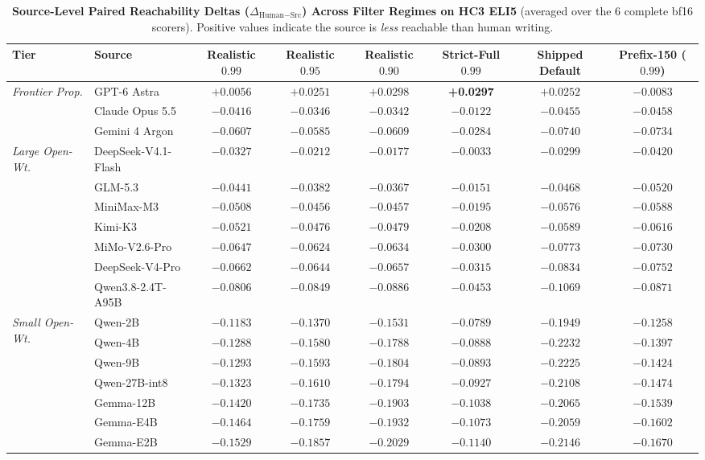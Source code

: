 \documentclass[11pt,a4paper,twocolumn]{article}
\begin{document}
\begin{table}[t]
\centering
\scriptsize
\setlength{\tabcolsep}{4.2pt}
\begin{tabular}{llcccccc}
\toprule
\textbf{Tier} & \textbf{Source} & \textbf{Realistic $0.99$} & \textbf{Realistic $0.95$} & \textbf{Realistic $0.90$} & \textbf{Strict-Full $0.99$} & \textbf{Shipped Default} & \textbf{Prefix-150 ($0.99$)} \\
\midrule
\multirow{3}{*}{\textit{Frontier Prop.}}
 & GPT-6 Astra & $+0.0056$ & $+0.0251$ & $+0.0298$ & \textbf{+0.0297} & $+0.0252$ & $-0.0083$ \\
 & Claude Opus 5.5 & $-0.0416$ & $-0.0346$ & $-0.0342$ & $-0.0122$ & $-0.0455$ & $-0.0458$ \\
 & Gemini 4 Argon & $-0.0607$ & $-0.0585$ & $-0.0609$ & $-0.0284$ & $-0.0740$ & $-0.0734$ \\
\midrule
\multirow{7}{*}{\textit{Large Open-Wt.}}
 & DeepSeek-V4.1-Flash & $-0.0327$ & $-0.0212$ & $-0.0177$ & $-0.0033$ & $-0.0299$ & $-0.0420$ \\
 & GLM-5.3 & $-0.0441$ & $-0.0382$ & $-0.0367$ & $-0.0151$ & $-0.0468$ & $-0.0520$ \\
 & MiniMax-M3 & $-0.0508$ & $-0.0456$ & $-0.0457$ & $-0.0195$ & $-0.0576$ & $-0.0588$ \\
 & Kimi-K3 & $-0.0521$ & $-0.0476$ & $-0.0479$ & $-0.0208$ & $-0.0589$ & $-0.0616$ \\
 & MiMo-V2.6-Pro & $-0.0647$ & $-0.0624$ & $-0.0634$ & $-0.0300$ & $-0.0773$ & $-0.0730$ \\
 & DeepSeek-V4-Pro & $-0.0662$ & $-0.0644$ & $-0.0657$ & $-0.0315$ & $-0.0834$ & $-0.0752$ \\
 & Qwen3.8-2.4T-A95B & $-0.0806$ & $-0.0849$ & $-0.0886$ & $-0.0453$ & $-0.1069$ & $-0.0871$ \\
\midrule
\multirow{7}{*}{\textit{Small Open-Wt.}}
 & Qwen-2B & $-0.1183$ & $-0.1370$ & $-0.1531$ & $-0.0789$ & $-0.1949$ & $-0.1258$ \\
 & Qwen-4B & $-0.1288$ & $-0.1580$ & $-0.1788$ & $-0.0888$ & $-0.2232$ & $-0.1397$ \\
 & Qwen-9B & $-0.1293$ & $-0.1593$ & $-0.1804$ & $-0.0893$ & $-0.2225$ & $-0.1424$ \\
 & Qwen-27B-int8 & $-0.1323$ & $-0.1610$ & $-0.1794$ & $-0.0927$ & $-0.2108$ & $-0.1474$ \\
 & Gemma-12B & $-0.1420$ & $-0.1735$ & $-0.1903$ & $-0.1038$ & $-0.2065$ & $-0.1539$ \\
 & Gemma-E4B & $-0.1464$ & $-0.1759$ & $-0.1932$ & $-0.1073$ & $-0.2059$ & $-0.1602$ \\
 & Gemma-E2B & $-0.1529$ & $-0.1857$ & $-0.2029$ & $-0.1140$ & $-0.2146$ & $-0.1670$ \\
\bottomrule
\end{tabular}
\caption{\textbf{Source-Level Paired Reachability Deltas ($\Delta_{\text{Human}-\text{Src}}$) Across Filter Regimes on HC3 ELI5} (averaged over the 6 complete bf16 scorers). Positive values indicate the source is \emph{less} reachable than human writing.}
\label{tab:source_deltas}
\end{table}
\end{document}
